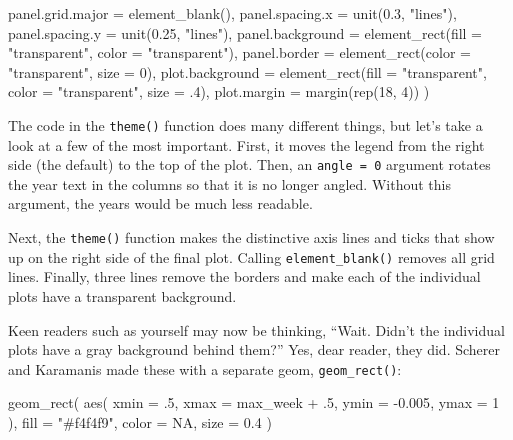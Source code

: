 \documentclass[
]{book}
\newenvironment{Shaded}{\begin{snugshade}}{\end{snugshade}}
\newcommand{\AttributeTok}[1]{\textcolor[rgb]{0.77,0.63,0.00}{#1}}
\newcommand{\ConstantTok}[1]{\textcolor[rgb]{0.00,0.00,0.00}{#1}}
\newcommand{\DecValTok}[1]{\textcolor[rgb]{0.00,0.00,0.81}{#1}}
\newcommand{\FloatTok}[1]{\textcolor[rgb]{0.00,0.00,0.81}{#1}}
\newcommand{\FunctionTok}[1]{\textcolor[rgb]{0.00,0.00,0.00}{#1}}
\newcommand{\NormalTok}[1]{#1}
\newcommand{\SpecialCharTok}[1]{\textcolor[rgb]{0.00,0.00,0.00}{#1}}
\newcommand{\StringTok}[1]{\textcolor[rgb]{0.31,0.60,0.02}{#1}}
\begin{document}
\begin{Shaded}
\begin{Highlighting}[]
    \AttributeTok{panel.grid.major =} \FunctionTok{element\_blank}\NormalTok{(),}
    \AttributeTok{panel.spacing.x =} \FunctionTok{unit}\NormalTok{(}\FloatTok{0.3}\NormalTok{, }\StringTok{"lines"}\NormalTok{),}
    \AttributeTok{panel.spacing.y =} \FunctionTok{unit}\NormalTok{(}\FloatTok{0.25}\NormalTok{, }\StringTok{"lines"}\NormalTok{),}
    \AttributeTok{panel.background =} \FunctionTok{element\_rect}\NormalTok{(}\AttributeTok{fill =} \StringTok{"transparent"}\NormalTok{, }
                                    \AttributeTok{color =} \StringTok{"transparent"}\NormalTok{),}
    \AttributeTok{panel.border =} \FunctionTok{element\_rect}\NormalTok{(}\AttributeTok{color =} \StringTok{"transparent"}\NormalTok{, }
                                \AttributeTok{size =} \DecValTok{0}\NormalTok{),}
    \AttributeTok{plot.background =} \FunctionTok{element\_rect}\NormalTok{(}\AttributeTok{fill =} \StringTok{"transparent"}\NormalTok{, }
                                   \AttributeTok{color =} \StringTok{"transparent"}\NormalTok{, }
                                   \AttributeTok{size =}\NormalTok{ .}\DecValTok{4}\NormalTok{),}
    \AttributeTok{plot.margin =} \FunctionTok{margin}\NormalTok{(}\FunctionTok{rep}\NormalTok{(}\DecValTok{18}\NormalTok{, }\DecValTok{4}\NormalTok{))}
\NormalTok{  )}
\end{Highlighting}
\end{Shaded}

The code in the \texttt{theme()} function does many different things, but let's take a look at a few of the most important. First, it moves the legend from the right side (the default) to the top of the plot. Then, an \texttt{angle\ =\ 0} argument rotates the year text in the columns so that it is no longer angled. Without this argument, the years would be much less readable.

Next, the \texttt{theme()} function makes the distinctive axis lines and ticks that show up on the right side of the final plot. Calling \texttt{element\_blank()} removes all grid lines. Finally, three lines remove the borders and make each of the individual plots have a transparent background.

Keen readers such as yourself may now be thinking, ``Wait. Didn't the individual plots have a gray background behind them?'' Yes, dear reader, they did. Scherer and Karamanis made these with a separate geom, \texttt{geom\_rect()}:

\begin{Shaded}
\begin{Highlighting}[]
\FunctionTok{geom\_rect}\NormalTok{(}
  \FunctionTok{aes}\NormalTok{(}
    \AttributeTok{xmin =}\NormalTok{ .}\DecValTok{5}\NormalTok{,}
    \AttributeTok{xmax =}\NormalTok{ max\_week }\SpecialCharTok{+}\NormalTok{ .}\DecValTok{5}\NormalTok{,}
    \AttributeTok{ymin =} \SpecialCharTok{{-}}\FloatTok{0.005}\NormalTok{,}
    \AttributeTok{ymax =} \DecValTok{1}
\NormalTok{  ),}
  \AttributeTok{fill =} \StringTok{"\#f4f4f9"}\NormalTok{,}
  \AttributeTok{color =} \ConstantTok{NA}\NormalTok{,}
  \AttributeTok{size =} \FloatTok{0.4}
\NormalTok{)}
\end{Highlighting}
\end{Shaded}
\end{document}
